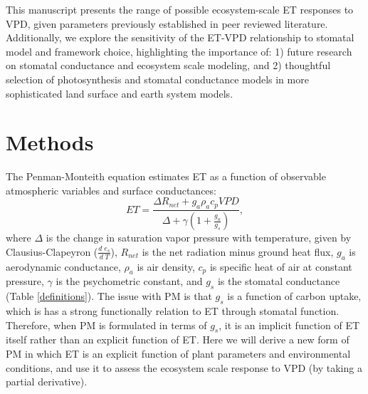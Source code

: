 \documentclass[draft]{agujournal2019}
\begin{document}
This manuscript presents the range of possible ecosystem-scale ET
responses to VPD, given parameters previously established in peer
reviewed literature. Additionally, we explore the sensitivity of the
ET-VPD relationship to stomatal model and framework choice,
highlighting the importance of: 1) future research on stomatal
conductance and ecosystem scale modeling, and 2) thoughtful selection
of photosynthesis and stomatal conductance models in more
sophisticated land surface and earth system models.

\section{Methods}
\label{methods}
The Penman-Monteith equation \cite<hereafter PM,>[]{Penman_1948,
  Monteith_1965} estimates ET as a function of observable atmospheric
variables and surface conductances:
  \begin{equation}
    \label{orig_pen}
    ET = \frac{\Delta R_{net} + g_a \rho_a c_p VPD}{\Delta + \gamma(1 + \frac{g_a}{g_s})},
  \end{equation}
  where $\Delta$ is the change in saturation vapor pressure with
  temperature, given by Clausius-Clapeyron
  ($\frac{d \; e_s}{d \; T}$), $R_{net}$ is the net radiation minus
  ground heat flux, $g_a$ is aerodynamic conductance, $\rho_a$ is air
  density, $c_p$ is specific heat of air at constant pressure,
  $\gamma$ is the psychometric constant, and $g_s$ is the stomatal
  conductance (Table \ref{definitions}). The issue with PM is that
  $g_s$ is a function of carbon uptake, which is has a strong
  functionally relation to ET through stomatal function. Therefore,
  when PM is formulated in terms of $g_s$, it is an implicit function
  of ET itself rather than an explicit function of ET. Here we will
  derive a new form of PM in which ET is an explicit function of plant
  parameters and environmental conditions, and use it to assess the
  ecosystem scale response to VPD (by taking a partial derivative).
\end{document}
